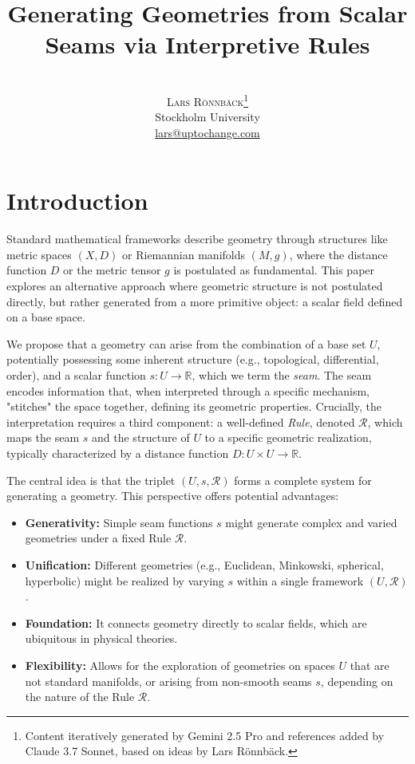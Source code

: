 \documentclass[twoside,twocolumn]{article}
\title{\vspace{5mm}\fontsize{24pt}{10pt}\selectfont\textbf{Generating Geometries from Scalar Seams via Interpretive Rules}} %
\author{%
\\[2mm] %
\textsc{Lars Rönnbäck}\thanks{Content iteratively generated by Gemini 2.5 Pro and references added by Claude 3.7 Sonnet, based on ideas by Lars Rönnbäck.}
\\[1ex] %
\normalsize Stockholm University \\ %
\normalsize \href{mailto:lars.ronnback@anchormodeling.com}{lars@uptochange.com} %
\\[1ex] %
}
\date{}
\numberwithin{equation}{section} %
\begin{document}
\maketitle
\thispagestyle{fancy}


\section{Introduction}

Standard mathematical frameworks describe geometry through structures like metric spaces $(X, D)$ or Riemannian manifolds $(M, g)$, where the distance function $D$ or the metric tensor $g$ is postulated as fundamental. This paper explores an alternative approach where geometric structure is not postulated directly, but rather generated from a more primitive object: a scalar field defined on a base space.

We propose that a geometry can arise from the combination of a base set $U$, potentially possessing some inherent structure (e.g., topological, differential, order), and a scalar function $s: U \to \mathbb{R}$, which we term the \emph{seam}. The seam encodes information that, when interpreted through a specific mechanism, "stitches" the space together, defining its geometric properties. Crucially, the interpretation requires a third component: a well-defined \emph{Rule}, denoted $\mathcal{R}$, which maps the seam $s$ and the structure of $U$ to a specific geometric realization, typically characterized by a distance function $D: U \times U \to \mathbb{R}$.

The central idea is that the triplet $(U, s, \mathcal{R})$ forms a complete system for generating a geometry. This perspective offers potential advantages:
\begin{itemize}
    \item \textbf{Generativity:} Simple seam functions $s$ might generate complex and varied geometries under a fixed Rule $\mathcal{R}$.
    \item \textbf{Unification:} Different geometries (e.g., Euclidean, Minkowski, spherical, hyperbolic) might be realized by varying $s$ within a single framework $(U, \mathcal{R})$.
    \item \textbf{Foundation:} It connects geometry directly to scalar fields, which are ubiquitous in physical theories. %
    \item \textbf{Flexibility:} Allows for the exploration of geometries on spaces $U$ that are not standard manifolds, or arising from non-smooth seams $s$, depending on the nature of the Rule $\mathcal{R}$.
\end{itemize}
\end{document}
